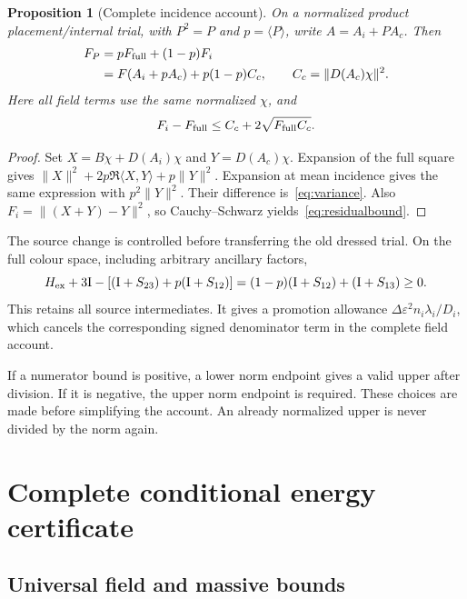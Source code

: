 \documentclass[11pt]{article}
\newtheorem{proposition}[theorem]{Proposition}
\theoremstyle{definition}
\newcommand{\Id}{\mathrm I}
\newcommand{\eps}{\varepsilon}
\begin{document}
\begin{proposition}[Complete incidence account]\label{prop:variance}
On a normalized product placement/internal trial, with $P^2=P$ and $p=\langle P\rangle$, write $A=A_i+PA_c$. Then
\begin{align}\label{eq:variance}
 F_P&=pF_{\rm full}+(1-p)F_i\notag\\
 &=F(A_i+pA_c)+p(1-p)C_c,
 \qquad C_c=\|D(A_c)\chi\|^2.
\end{align}
Here all field terms use the same normalized $\chi$, and
\begin{equation}\label{eq:residualbound}
 F_i-F_{\rm full}\leq C_c+2\sqrt{F_{\rm full}C_c}.
\end{equation}
\end{proposition}
\begin{proof}
Set $X=B\chi+D(A_i)\chi$ and $Y=D(A_c)\chi$. Expansion of the full square gives $\|X\|^2+2p\Re\langle X,Y\rangle+p\|Y\|^2$. Expansion at mean incidence gives the same expression with $p^2\|Y\|^2$. Their difference is~\eqref{eq:variance}. Also $F_i=\|(X+Y)-Y\|^2$, so Cauchy--Schwarz yields~\eqref{eq:residualbound}.
\end{proof}

The source change is controlled before transferring the old dressed trial. On the full colour space, including arbitrary ancillary factors,
\begin{equation}\label{eq:promotion}
 H_{\rm ex}+3\Id-\left[(\Id+S_{23})+p(\Id+S_{12})\right]
 =(1-p)(\Id+S_{12})+(\Id+S_{13})\geq0.
\end{equation}
This retains all source intermediates. It gives a promotion allowance $\Delta\eps^2n_i\lambda_i/D_i$, which cancels the corresponding signed denominator term in the complete field account.

If a numerator bound is positive, a lower norm endpoint gives a valid upper after division. If it is negative, the upper norm endpoint is required. These choices are made before simplifying the account. An already normalized upper is never divided by the norm again.

\section{Complete conditional energy certificate}\label{sec:certificate}

\subsection{Universal field and massive bounds}
\end{document}
